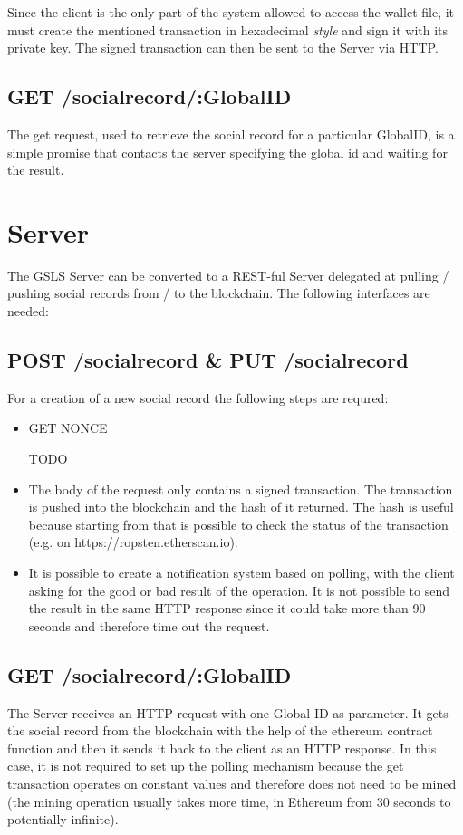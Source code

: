 Since the client is the only part of the system allowed to access the wallet file, it must create the mentioned transaction in hexadecimal \textit{style} and sign it with its private key.
The signed transaction can then be sent to the Server via HTTP.

\subsection{GET /socialrecord/:GlobalID}
The get request, used to retrieve the social record for a particular GlobalID, is a simple promise that contacts the server specifying the global id and waiting for the result.

\section{Server}
The GSLS Server can be converted to a REST-ful Server delegated at pulling / pushing social records from / to the blockchain.
The following interfaces are needed:
\subsection{POST /socialrecord \& PUT /socialrecord}
  For a creation of a new social record the following steps are requred:
  \begin{itemize}
    \item GET NONCE \begin{notation}
      TODO
  \end{notation}
    \item The body of the request only contains a signed transaction. The transaction is pushed into the blockchain and the hash of it returned. The hash is useful because starting from that is possible to check the status of the transaction (e.g. on https://ropsten.etherscan.io).
    \item It is possible to create a notification system based on polling, with the client asking for the good or bad result of the operation. It is not possible to send the result in the same HTTP response since it could take more than 90 seconds and therefore time out the request.
  \end{itemize}
\subsection{GET /socialrecord/:GlobalID}
The Server receives an HTTP request with one Global ID as parameter. It gets the social record from the blockchain with the help of the ethereum contract function and then it sends it back to the client as an HTTP response.
In this case, it is not required to set up the polling mechanism because the get transaction operates on constant values and therefore does not need to be mined (the mining operation usually takes more time, in Ethereum from 30 seconds to potentially infinite).

